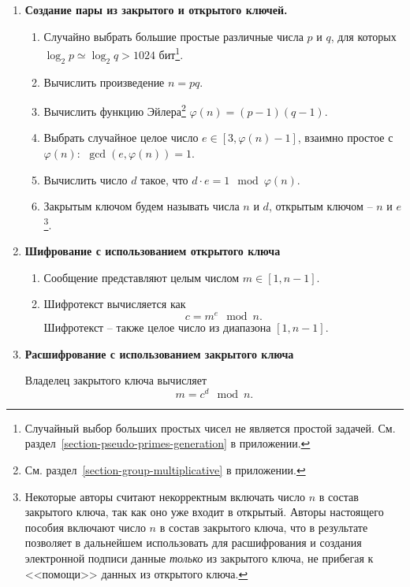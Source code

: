 \begin{enumerate}
    \item \textbf{Создание пары из закрытого и открытого ключей.}
        \begin{enumerate}
            \item Случайно выбрать большие простые различные числа $p$ и $q$, для которых $\log_2 p \simeq \log_2 q > 1024$ бит\footnote{Случайный выбор больших простых чисел не является простой задачей. См. раздел~\ref{section-pseudo-primes-generation} в приложении.}.
            \item Вычислить произведение $n = pq$.
            \item Вычислить функцию Эйлера\footnote{См. раздел~\ref{section-group-multiplicative} в приложении.} $\varphi(n) = (p-1)(q-1)$.
            \item Выбрать случайное целое число $e \in [3, \varphi(n)-1]$, взаимно простое с $\varphi(n)$: $~ \gcd(e, \varphi(n)) = 1$.
            \item Вычислить число $d$ такое, что $d \cdot e = 1 \mod \varphi(n)$.
            \item Закрытым ключом будем называть числа $n$ и $d$, открытым ключом -- $n$ и $e$\footnote{Некоторые авторы считают некорректным включать число $n$ в состав закрытого ключа, так как оно уже входит в открытый. Авторы настоящего пособия включают число $n$ в состав закрытого ключа, что в результате позволяет в дальнейшем использовать для расшифрования и создания электронной подписи данные \emph{только} из закрытого ключа, не прибегая к <<помощи>> данных из открытого ключа.}.
        \end{enumerate}

    \item \textbf{Шифрование с использованием открытого ключа}
        \begin{enumerate}
            \item Сообщение представляют целым числом $m \in [1, n-1]$.
            \item Шифротекст вычисляется как
                \[ c = m^e \mod n. \]
                Шифротекст -- также целое число из диапазона $[1, n-1]$.
        \end{enumerate}
    \item \textbf{Расшифрование с использованием закрытого ключа}

        Владелец закрытого ключа вычисляет
                \[ m = c^d \mod n. \]
\end{enumerate}

